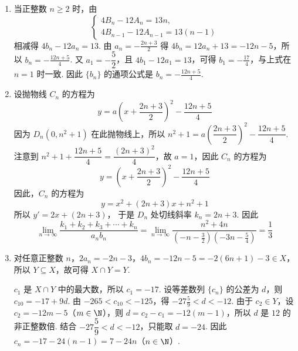 \documentclass[UTF8,a4paper,oneside,11pt]{ctexbook}
\begin{document}
\begin{solution}
\begin{enumerate}
\item 当正整数 \(n\geqslant2\) 时，由
\[
\begin{cases}
4B_n-12A_n=13n,\\
4B_{n-1}-12A_{n-1}=13(n-1)
\end{cases}
\]
相减得 \(4b_n-12a_n=13\). 由 \(a_n=-\frac{2n+3}{2}\) 得
\(4b_n=12a_n+13=-12n-5\)，所以 \(b_n=-\frac{12n+5}{4}\).
又 \(a_1=-\dfrac52\)，且 \(4b_1-12a_1=13\)，可得 \(b_1=-\frac{17}{4}\)，与上式在 \(n=1\) 时一致. 因此 \(\{b_n\}\) 的通项公式是 \(b_n=-\frac{12n+5}{4}\).

\item 设抛物线 \(C_n\) 的方程为
\[
y=a\left(x+\frac{2n+3}{2}\right)^2-\frac{12n+5}{4}
\]
因为 \(D_n(0,n^{2}+1)\) 在此抛物线上，所以
\(n^2+1=a\left(\dfrac{2n+3}{2}\right)^2-\dfrac{12n+5}{4}\). 注意到 \(n^2+1+\dfrac{12n+5}{4}=\dfrac{(2n+3)^2}{4}\)，故 \(a=1\)，因此 \(C_n\) 的方程为
\[
y=\left(x+\frac{2n+3}{2}\right)^2-\frac{12n+5}{4}
\]
因此，\(C_n\) 的方程为
\[
y=x^2+(2n+3)x+n^2+1
\]
所以 \(y'=2x+(2n+3)\)，
于是 \(D_n\) 处切线斜率 \(k_n=2n+3\).
因此
\[
\lim_{n\to\infty}\frac{k_1+k_2+k_3+\cdots+k_n}{a_nb_n}
=\lim_{n\to\infty}\frac{n^2+4n}{\left(-n-\frac{3}{2}\right)\left(-3n-\frac{5}{4}\right)}
=\frac{1}{3}
\]

\item 对任意正整数 \(n\)，\(2a_n=-2n-3\)，\(4b_n=-12n-5=-2(6n+1)-3\in X\)，所以 \(Y\subseteq X\)，故可得 \(X\cap Y=Y\).

\(c_1\) 是 \(X\cap Y\) 中的最大数，所以 \(c_1=-17\). 设等差数列 \(\{c_n\}\) 的公差为 \(d\)，则 \(c_{10}=-17+9d\).
由 \(-265<c_{10}<-125\)，得 \(-27\frac{5}{9}<d<-12\).
由于 \(c_2\in Y\)，设 \(c_2=-12m-5\)（\(m\in\N\)），则 \(d=c_2-c_1=-12(m-1)\)，所以 \(d\) 是 \(12\) 的非正整数倍. 结合 \(-27\dfrac59<d<-12\)，只能取 \(d=-24\). 因此 \(c_n=-17-24(n-1)=7-24n\)（\(n\in\N\)）.
\end{enumerate}
\end{solution}

\end{document}
